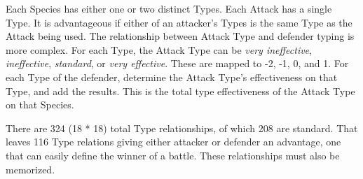 Each Species has either one or two distinct Types.
Each Attack has a single Type.
It is advantageous if either of an attacker's Types is the same Type as
 the Attack being used.
The relationship between Attack Type and defender typing is more complex.
For each Type, the Attack Type can be \textit{very ineffective},
 \textit{ineffective}, \textit{standard}, or \textit{very effective}.
These are mapped to -2, -1, 0, and 1.
For each Type of the defender, determine the Attack Type's effectiveness
 on that Type, and add the results.
This is the total type effectiveness of the Attack Type on that Species.

There are 324 (18 * 18) total Type relationships, of which 208 are standard.
That leaves 116 Type relations giving either attacker or defender an advantage,
 one that can easily define the winner of a battle.
These relationships must also be memorized.

